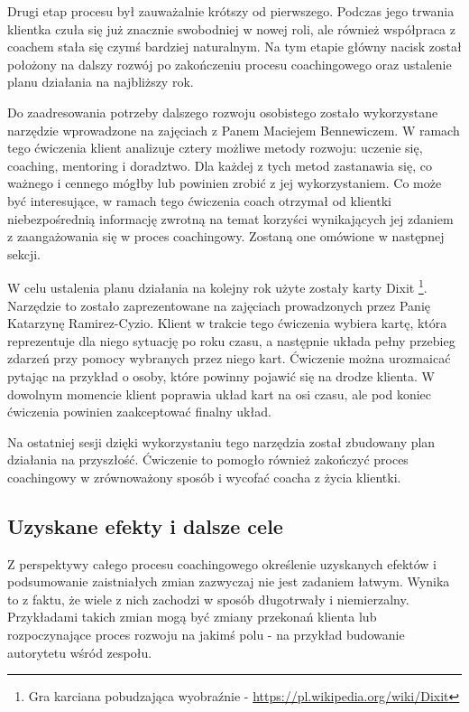 Drugi etap procesu był zauważalnie krótszy od pierwszego. Podczas jego trwania klientka czuła się już znacznie swobodniej w nowej roli, ale również współpraca
z coachem stała się czymś bardziej naturalnym. Na tym etapie główny nacisk został położony na dalszy rozwój po zakończeniu procesu coachingowego
oraz ustalenie planu działania na najbliższy rok.

Do zaadresowania potrzeby dalszego rozwoju osobistego zostało wykorzystane narzędzie wprowadzone na zajęciach z Panem Maciejem Bennewiczem. W ramach tego
ćwiczenia klient analizuje cztery możliwe metody rozwoju: uczenie się, coaching, mentoring i doradztwo. Dla każdej z tych metod zastanawia się,
co ważnego i cennego mógłby lub powinien zrobić z jej wykorzystaniem. Co może być interesujące, w ramach tego ćwiczenia coach otrzymał od klientki
niebezpośrednią informację zwrotną na temat korzyści wynikających jej zdaniem z zaangażowania się w proces coachingowy. Zostaną one omówione w
następnej sekcji.

W celu ustalenia planu działania na kolejny rok użyte zostały karty Dixit
\footnote{Gra karciana pobudzająca wyobraźnie - \url{https://pl.wikipedia.org/wiki/Dixit}}. Narzędzie to zostało zaprezentowane na zajęciach
prowadzonych przez Panię Katarzynę Ramirez-Cyzio. Klient w trakcie tego ćwiczenia wybiera kartę, która reprezentuje dla niego sytuację po roku czasu,
a następnie układa pełny przebieg zdarzeń przy pomocy wybranych przez niego kart. Ćwiczenie można urozmaicać pytając na przykład o osoby, które powinny
pojawić się na drodze klienta. W dowolnym momencie klient poprawia układ kart na osi czasu, ale pod koniec ćwiczenia powinien zaakceptować finalny układ.

Na ostatniej sesji dzięki wykorzystaniu tego narzędzia został zbudowany plan działania na przyszłość. Ćwiczenie to pomogło również zakończyć
proces coachingowy w zrównoważony sposób i wycofać coacha z życia klientki.

\subsection{Uzyskane efekty i dalsze cele}

Z perspektywy całego procesu coachingowego określenie uzyskanych efektów i podsumowanie zaistniałych zmian zazwyczaj nie jest zadaniem łatwym.
Wynika to z faktu, że wiele z nich zachodzi w sposób długotrwały i niemierzalny. Przykładami takich zmian mogą być zmiany przekonań klienta lub
rozpoczynające proces rozwoju na jakimś polu - na przykład budowanie autorytetu wśród zespołu.

